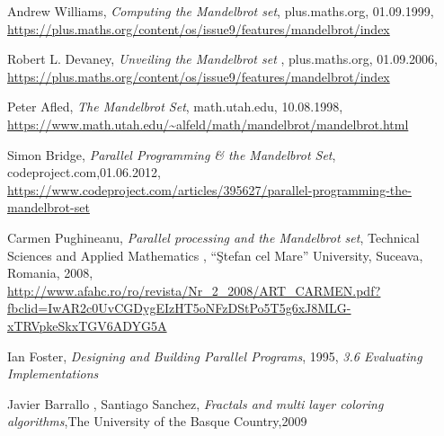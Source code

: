 \begin{thebibliography}{99}

  
Andrew Williams,
  \textit{Computing the Mandelbrot set},
  plus.maths.org,
  01.09.1999, \newline \url{https://plus.maths.org/content/os/issue9/features/mandelbrot/index}

Robert L. Devaney,
  \textit{Unveiling the Mandelbrot set
},
  plus.maths.org,
  01.09.2006, \newline \url{https://plus.maths.org/content/os/issue9/features/mandelbrot/index}
  
Peter Afled,
\textit{The Mandelbrot Set},
math.utah.edu,
10.08.1998, \newline \url{https://www.math.utah.edu/~alfeld/math/mandelbrot/mandelbrot.html}

Simon Bridge,
\textit{Parallel Programming \& the Mandelbrot Set},
codeproject.com,01.06.2012, \newline \url{https://www.codeproject.com/articles/395627/parallel-programming-the-mandelbrot-set}
 
Carmen Pughineanu,
\textit{Parallel processing and the Mandelbrot set}, Technical Sciences and Applied Mathematics 
, “Ştefan cel Mare” University, Suceava, Romania, 2008,
\newline \url{http://www.afahc.ro/ro/revista/Nr_2_2008/ART_CARMEN.pdf?fbclid=IwAR2c0UvCGDygEIzHT5oNFzDStPo5T5g6xJ8MLG-xTRVpkeSkxTGV6ADYG5A}

Ian Foster,
\textit{Designing and Building Parallel Programs},
1995, \textit{3.6 Evaluating Implementations}

Javier Barrallo ,
Santiago Sanchez,
\textit{Fractals and multi layer 
coloring algorithms},The University of the Basque Country,2009 


\end{thebibliography}